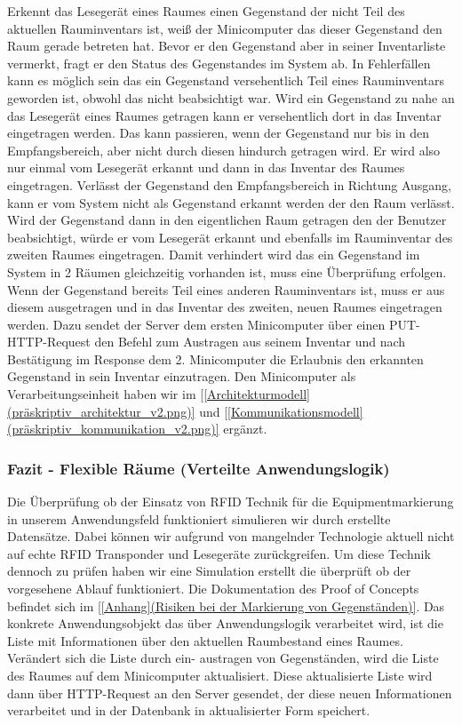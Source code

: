 Erkennt das Lesegerät eines Raumes einen Gegenstand der nicht Teil des
aktuellen Rauminventars ist, weiß der Minicomputer das dieser Gegenstand
den Raum gerade betreten hat. Bevor er den Gegenstand aber in seiner
Inventarliste vermerkt, fragt er den Status des Gegenstandes im System ab.
In Fehlerfällen kann es möglich sein das ein Gegenstand versehentlich Teil
eines Rauminventars geworden ist, obwohl das nicht beabsichtigt war. Wird ein
Gegenstand zu nahe an das Lesegerät eines Raumes getragen kann er
versehentlich dort in das Inventar eingetragen werden. Das kann passieren,
wenn der Gegenstand nur bis in den Empfangsbereich, aber nicht durch diesen
hindurch getragen wird. Er wird also nur einmal vom Lesegerät erkannt und dann
in das Inventar des Raumes eingetragen. Verlässt der Gegenstand den
Empfangsbereich in Richtung Ausgang, kann er vom System nicht als Gegenstand
erkannt werden der den Raum verlässt. Wird der Gegenstand dann in den
eigentlichen Raum getragen den der Benutzer beabsichtigt, würde er vom
Lesegerät erkannt und ebenfalls im Rauminventar des zweiten Raumes eingetragen.
Damit verhindert wird das ein Gegenstand im System in 2 Räumen gleichzeitig
vorhanden ist, muss eine Überprüfung erfolgen. Wenn der Gegenstand bereits Teil
eines anderen Rauminventars ist, muss er aus diesem ausgetragen und in das
Inventar des zweiten, neuen Raumes eingetragen werden. Dazu sendet der Server
dem ersten Minicomputer über einen PUT-HTTP-Request den Befehl zum Austragen
aus seinem Inventar und nach Bestätigung im Response dem 2. Minicomputer die
Erlaubnis den erkannten Gegenstand in sein Inventar einzutragen.
Den Minicomputer als Verarbeitungseinheit haben wir im \ref{[Architekturmodell](präskriptiv_architektur_v2.png)} 
und \ref{[Kommunikationsmodell](präskriptiv_kommunikation_v2.png)} ergänzt.


\subsubsection{Fazit - Flexible Räume (Verteilte Anwendungslogik)}
\label{sec:Fazit_Flexible_Räume_(Verteilte_Anwendungslogik)}

Die Überprüfung ob der Einsatz von RFID Technik für die Equipmentmarkierung in
unserem Anwendungsfeld funktioniert simulieren wir durch erstellte Datensätze.
Dabei können wir aufgrund von mangelnder Technologie aktuell nicht auf echte
RFID Transponder und Lesegeräte zurückgreifen. Um diese Technik dennoch zu
prüfen haben wir eine Simulation erstellt die überprüft ob der vorgesehene
Ablauf funktioniert. Die Dokumentation des Proof of Concepts befindet sich im
\ref{[Anhang](Risiken bei der Markierung von Gegenständen)}.
Das konkrete Anwendungsobjekt das über Anwendungslogik verarbeitet wird, ist
die Liste mit Informationen über den aktuellen Raumbestand eines Raumes.
Verändert sich die Liste durch ein- \bzw austragen von Gegenständen, wird die
Liste des Raumes auf dem Minicomputer aktualisiert. Diese aktualisierte Liste
wird dann über HTTP-Request an den Server gesendet, der diese neuen
Informationen verarbeitet und in der Datenbank in aktualisierter Form speichert.


